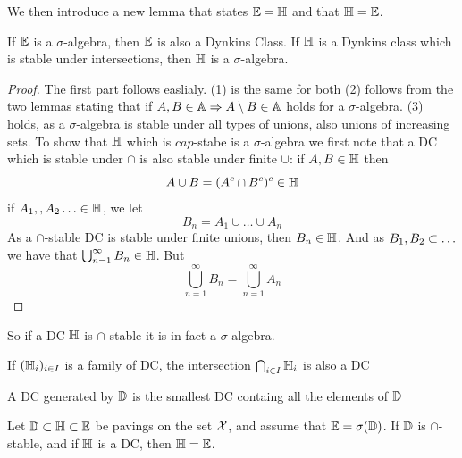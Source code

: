 We then introduce a new lemma that states \({\mathbb{E}}={\mathbb{H}}\) and that \({\mathbb{H}}={\mathbb{E}}\).
\begin{lem}
 If \({\mathbb{E}}\) is a \(\sigma\)-algebra, then \({\mathbb{E}}\) is also a Dynkins Class. If \({\mathbb{H}}\) is a Dynkins class which is stable under intersections, then \({\mathbb{H}}\) is a \(\sigma\)-algebra.
 \end{lem}
 \begin{proof}
 The first part follows easlialy. (1) is the same for both (2) follows from the two lemmas stating that if \( A,B\in{\mathbb{A}} \Rightarrow A\setminus B\in {\mathbb{A}}\) holds for a \(\sigma\)-algebra. (3) holds, as a \(\sigma\)-algebra is stable under all types of unions, also unions of increasing sets. To show that \({\mathbb{H}}\) which is \(cap\)-stabe  is a \(\sigma\)-algebra we first note that a DC which is stable under \(\cap\) is also stable  under finite \(\cup\): if \(A,B\in{\mathbb{H}}\) then
 \[
   A\cup B=(A^c\cap B^c)^c\in{\mathbb{H}}
 \]
 if \(A_1,,A_2\ldots\in{\mathbb{H}}\), we let
 \[
   B_n=A_1\cup\ldots\cup A_n
 \]
 As a \(\cap\)-stable DC is stable under finite unions, then \(B_n\in{\mathbb{H}}\). And as \(B_1, B_2 \subset \ldots\) we have that \(\bigcup_{n=1}^\infty B_n\in{\mathbb{H}}\). But
 \[
   \bigcup_{n=1}^\infty B_n=\bigcup_{n=1}^\infty A_n
 \]
 \end{proof}
So if a DC \({\mathbb{H}}\) is \(\cap\)-stable it is in fact a \(\sigma\)-algebra.
\begin{rem}
If \(({\mathbb{H}}_i)_{i\in I}\) is a family of DC, the intersection \(\bigcap_{i\in I}{\mathbb{H}}_i\) is also a DC
\end{rem}
\begin{rem}
A DC generated by \({\mathbb{D}}\) is the smallest DC containg all the elements of \({\mathbb{D}}\)
\end{rem}
\begin{lem}
Let \({\mathbb{D}}\subset{\mathbb{H}}\subset{\mathbb{E}}\) be pavings on the set \({\mathcal{X}}\), and assume that \({\mathbb{E}}=\sigma({\mathbb{D}})\). If \({\mathbb{D}}\) is \(\cap\)-stable, and if \({\mathbb{H}}\) is a DC, then \({\mathbb{H}}={\mathbb{E}}\).
\end{lem}
